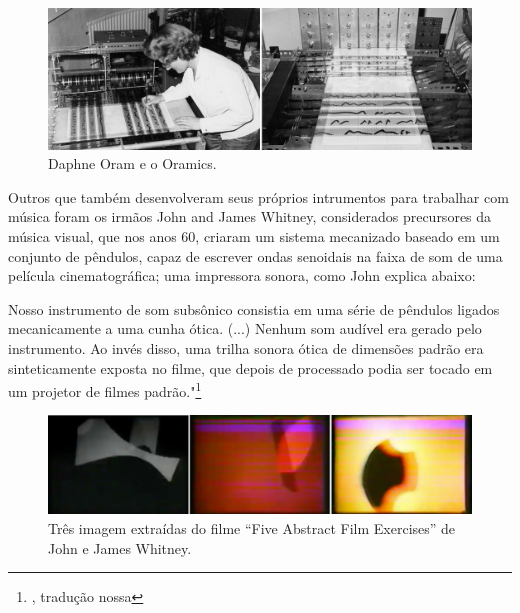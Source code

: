 \begin{figure}
    \caption{\label{oram}Daphne Oram e o Oramics.}
    
        \includegraphics[width=1\linewidth]{pictures/cap2/oramics}
    
\end{figure}


Outros que também desenvolveram seus próprios intrumentos para trabalhar com música foram os irmãos John and James Whitney, considerados precursores da música visual, que nos anos 60, criaram um sistema mecanizado baseado em um conjunto de pêndulos, capaz de escrever ondas senoidais na faixa de som de uma película cinematográfica; uma impressora sonora, como John explica abaixo:

\begin{citacao}
Nosso instrumento de som subsônico consistia em uma série de pêndulos ligados mecanicamente a uma cunha ótica. (...) Nenhum som audível era gerado pelo instrumento. Ao invés disso, uma trilha sonora ótica de dimensões padrão era sinteticamente exposta no filme, que depois de processado podia ser tocado em um projetor de filmes padrão."\footnote{\cite[152]{Whitney1980}, tradução nossa} 
\end{citacao}

\begin{figure}
    \caption{\label{witney}Três imagem extraídas do filme ``Five Abstract Film Exercises'' de John e James Whitney.}
    
        \includegraphics[width=1\linewidth]{pictures/cap2/witney}
    
\end{figure}


